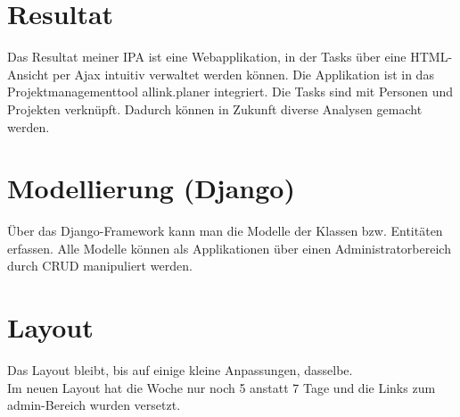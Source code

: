 \section{Resultat}
Das Resultat meiner IPA ist eine Webapplikation, in der Tasks über eine HTML-Ansicht per Ajax intuitiv verwaltet werden können. Die Applikation ist in das Projektmanagementtool allink.planer integriert.
Die Tasks sind mit Personen und Projekten verknüpft. Dadurch können in Zukunft diverse Analysen gemacht werden.
\section{Modellierung (Django)}
Über das Django-Framework kann man die Modelle der Klassen bzw. Entitäten erfassen.
Alle Modelle können als Applikationen über einen Administratorbereich durch CRUD manipuliert werden.
\section{Layout}
Das Layout bleibt, bis auf einige kleine Anpassungen, dasselbe.\\
Im neuen Layout hat die Woche nur noch 5 anstatt 7 Tage und die Links zum admin-Bereich wurden versetzt.
